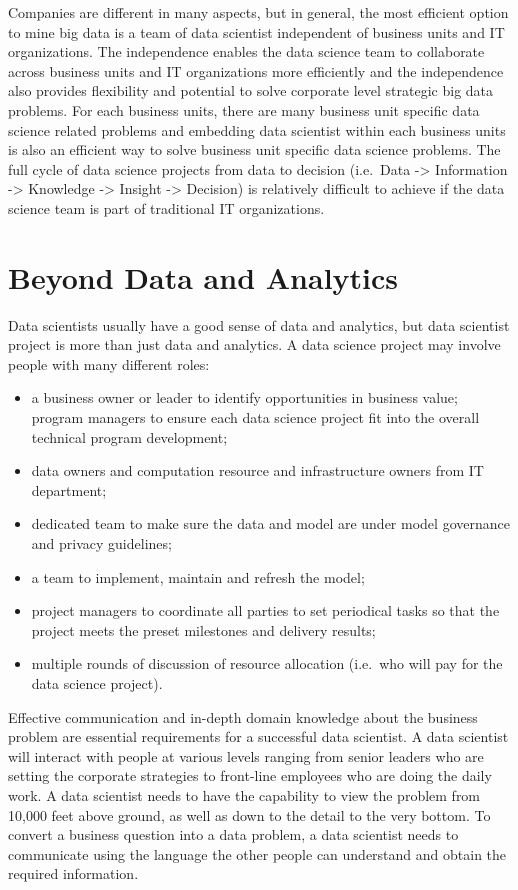 \documentclass[12pt,]{krantz}
\providecommand{\tightlist}{%
  \setlength{\itemsep}{0pt}\setlength{\parskip}{0pt}}
\theoremstyle{definition}
\theoremstyle{definition}
\theoremstyle{definition}
\theoremstyle{remark}
\begin{document}
Companies are different in many aspects, but in general, the most
efficient option to mine big data is a team of data scientist
independent of business units and IT organizations. The independence
enables the data science team to collaborate across business units and
IT organizations more efficiently and the independence also provides
flexibility and potential to solve corporate level strategic big data
problems. For each business units, there are many business unit specific
data science related problems and embedding data scientist within each
business units is also an efficient way to solve business unit specific
data science problems. The full cycle of data science projects from data
to decision (i.e.~Data -\textgreater{} Information -\textgreater{}
Knowledge -\textgreater{} Insight -\textgreater{} Decision) is
relatively difficult to achieve if the data science team is part of
traditional IT organizations.

\section{Beyond Data and Analytics}\label{beyond-data-and-analytics}

Data scientists usually have a good sense of data and analytics, but
data scientist project is more than just data and analytics. A data
science project may involve people with many different roles:

\begin{itemize}
\tightlist
\item
  a business owner or leader to identify opportunities in business
  value; program managers to ensure each data science project fit into
  the overall technical program development;
\item
  data owners and computation resource and infrastructure owners from IT
  department;
\item
  dedicated team to make sure the data and model are under model
  governance and privacy guidelines;
\item
  a team to implement, maintain and refresh the model;
\item
  project managers to coordinate all parties to set periodical tasks so
  that the project meets the preset milestones and delivery results;
\item
  multiple rounds of discussion of resource allocation (i.e.~who will
  pay for the data science project).
\end{itemize}

Effective communication and in-depth domain knowledge about the business
problem are essential requirements for a successful data scientist. A
data scientist will interact with people at various levels ranging from
senior leaders who are setting the corporate strategies to front-line
employees who are doing the daily work. A data scientist needs to have
the capability to view the problem from 10,000 feet above ground, as
well as down to the detail to the very bottom. To convert a business
question into a data problem, a data scientist needs to communicate
using the language the other people can understand and obtain the
required information.
\end{document}

